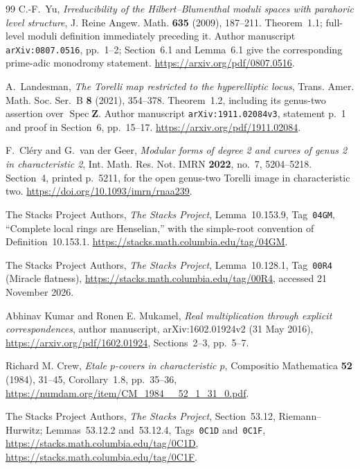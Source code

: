 \documentclass[11pt,a4paper]{article}
\begin{document}
\begin{thebibliography}{99}
C.-F.~Yu,
\emph{Irreducibility of the Hilbert--Blumenthal moduli spaces
with parahoric level structure},
J. Reine Angew. Math. \textbf{635} (2009), 187--211.
Theorem~1.1; full-level moduli definition immediately preceding it.
Author manuscript \texttt{arXiv:0807.0516}, pp.~1--2;
Section~6.1 and Lemma~6.1 give the corresponding
prime-adic monodromy statement.
\url{https://arxiv.org/pdf/0807.0516}.

A.~Landesman,
\emph{The Torelli map restricted to the hyperelliptic locus},
Trans. Amer. Math. Soc. Ser.~B \textbf{8} (2021), 354--378.
Theorem~1.2, including its genus-two assertion over
$\operatorname{Spec}\mathbf Z$.
Author manuscript \texttt{arXiv:1911.02084v3},
statement p.~1 and proof in Section~6, pp.~15--17.
\url{https://arxiv.org/pdf/1911.02084}.

F.~Cl\'ery and G.~van der Geer,
\emph{Modular forms of degree 2 and curves of genus 2 in
characteristic 2},
Int. Math. Res. Not. IMRN \textbf{2022}, no.~7, 5204--5218.
Section~4, printed p.~5211, for the open genus-two Torelli image
in characteristic two.
\url{https://doi.org/10.1093/imrn/rnaa239}.

The Stacks Project Authors,
\emph{The Stacks Project}, Lemma~10.153.9,
Tag~\texttt{04GM}, ``Complete local rings are Henselian,''
with the simple-root convention of Definition~10.153.1.
\url{https://stacks.math.columbia.edu/tag/04GM}.

The Stacks Project Authors, \emph{The Stacks Project},
Lemma~10.128.1, Tag~\texttt{00R4} (Miracle flatness),
\url{https://stacks.math.columbia.edu/tag/00R4},
accessed 21 November 2026.

Abhinav Kumar and Ronen E. Mukamel,
\emph{Real multiplication through explicit correspondences},
author manuscript, arXiv:1602.01924v2 (31 May 2016),
\url{https://arxiv.org/pdf/1602.01924},
Sections~2--3, pp.~5--7.

Richard M. Crew, \emph{Etale $p$-covers in characteristic $p$},
Compositio Mathematica \textbf{52} (1984), 31--45,
Corollary~1.8, pp.~35--36,
\url{https://numdam.org/item/CM_1984__52_1_31_0.pdf}.

The Stacks Project Authors, \emph{The Stacks Project},
Section~53.12, Riemann--Hurwitz;
Lemmas~53.12.2 and~53.12.4, Tags~\texttt{0C1D} and~\texttt{0C1F},
\url{https://stacks.math.columbia.edu/tag/0C1D},
\url{https://stacks.math.columbia.edu/tag/0C1F}.


\end{thebibliography}
\end{document}
